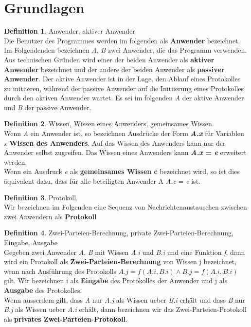 \documentclass{article}
\newcommand{\defined}[1]{{\bf #1}}
\newcommand{\var}[1]{{\em #1}}
\theoremstyle{definition}
\newtheorem{definition}{Definition}
\theoremstyle{remark}
\begin{document}
\tableofcontents

\section{Grundlagen}
\begin{definition}
Anwender, aktiver Anwender\\
Die Benutzer des Programmes werden im folgenden als \defined{Anwender} bezeichnet.
  Im Folgendenden bezeichnen \var{A}, \var{B} zwei Anwender, die das Programm 
verwenden.\\
  Aus technischen Gr\"unden wird einer der beiden Anwender als 
\defined{aktiver Anwender} bezeichnet und der andere der beiden Anwender als
\defined{passiver Anwender}. Der aktive Anwender ist in der Lage, den Ablauf
eines Protokolles zu initiieren, w\"ahrend der passive Anwender auf die 
Initiierung eines Protokolles durch den aktiven Anwender wartet. Es sei im
folgenden \var{A} der aktive Anwender und \var{B} der passive Anwender.
\end{definition}

\begin{definition}
Wissen, Wissen eines Anwenders, gemeinsames Wissen.\\
Wenn \var{A} ein Anwender ist, so bezeichnen Ausdr\"ucke der Form 
\defined{\var{A.x}} f\"ur Variablen \var{x} \defined{Wissen des Anwenders}. 
Auf das Wissen des Anwenders kann nur der Anwender selbst zugreifen.
Das Wissen eines Anwenders kann \defined{\var{A.x} = \var{e}} erweitert werden.\\
Wenn ein Ausdruck \var{e} als \defined{gemeinsames Wissen c} bezeichnet wird, 
so ist dies \"aquivalent dazu, dass f\"ur alle beteiligten Anwender 
A \var{A.c} = \var{e} ist.
\end{definition}

\begin{definition}
Protokoll.\\
Wir bezeichnen im Folgenden eine Sequenz von Nachrichtenaustauschen zwischen
zwei Anwendern als \defined{Protokoll}
\end{definition}

\begin{definition}
Zwei-Parteien-Berechnung, private Zwei-Parteien-Berechnung, Eingabe, Ausgabe\\
Gegeben zwei Anwender \var{A}, \var{B} mit Wissen \var{A.i} und \var{B.i}
und eine Funktion \var{f}, dann wird ein Protokoll als
\defined{Zwei-Parteien-Berechnung} von Wissen j bezeichnet, wenn nach 
Ausf\"uhrung des Protokolls  \(A.j = f(A.i, B.i) \wedge B.j = f(A.i, B.i) \)
gilt. Wir bezeichnen i als \defined{Eingabe} des Protokolles der Anwender
und j als \defined{Ausgabe} des Protokolles.\\
Wenn ausserdem gilt, dass \var{A} nur \var{A.j} als Wissen ueber \var{B.i}
erh\"alt und dass \var{B} nur \var{B.j} als Wissen ueber \var{A.i} erh\"alt,
dann bezeichnen wir das Zwei-Parteien-Protokoll als \defined{privates
Zwei-Parteien-Protokoll}.
\end{definition}
\end{document}
